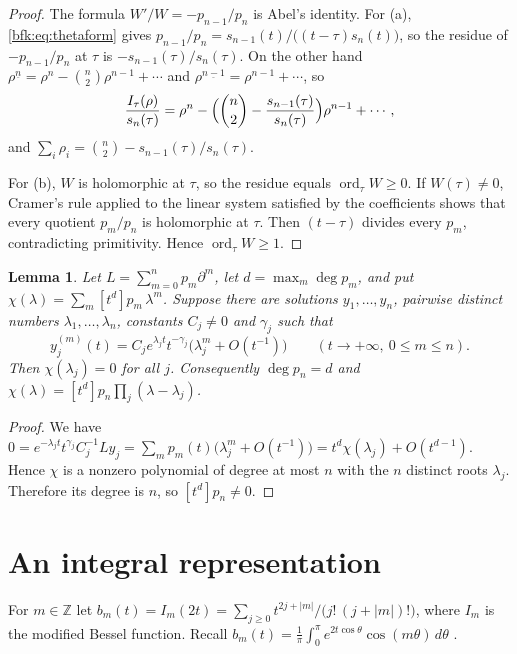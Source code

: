 \documentclass[11pt,a4paper]{article}
\newtheorem{lemma}[theorem]{Lemma}
\theoremstyle{definition}
\theoremstyle{remark}
\numberwithin{equation}{section}
\newcommand{\Z}{\mathbb{Z}}
\newcommand{\ff}[2]{#1^{\underline{#2}}}
\DeclareMathOperator{\ord}{ord}
\begin{document}
\begin{proof}
The formula $W'/W=-p_{n-1}/p_n$ is Abel's identity. For (a), \eqref{bfk:eq:thetaform} gives $p_{n-1}/p_n=s_{n-1}(t)/\bigl((t-\tau)s_n(t)\bigr)$, so the residue of $-p_{n-1}/p_n$ at $\tau$ is $-s_{n-1}(\tau)/s_n(\tau)$. On the other hand $\ff{\rho}{n}=\rho^n-\binom n2\rho^{n-1}+\cdots$ and $\ff{\rho}{n-1}=\rho^{n-1}+\cdots$, so
\[
\frac{I_\tau(\rho)}{s_n(\tau)}=\rho^n-\Bigl(\binom n2-\frac{s_{n-1}(\tau)}{s_n(\tau)}\Bigr)\rho^{n-1}+\cdots,
\]
and $\sum_i\rho_i=\binom n2-s_{n-1}(\tau)/s_n(\tau)$.

For (b), $W$ is holomorphic at $\tau$, so the residue equals $\ord_\tau W\ge0$. If $W(\tau)\ne0$, Cramer's rule applied to the linear system satisfied by the coefficients shows that every quotient $p_m/p_n$ is holomorphic at $\tau$. Then $(t-\tau)$ divides every $p_m$, contradicting primitivity. Hence ${\ord_\tau W\ge1}$.
\end{proof}

\begin{lemma}\label{bfk:lem:top}
Let $L=\sum_{m=0}^np_m\partial^m$, let $d=\max_m\deg p_m$, and put $\chi(\lambda)=\sum_{m}[t^d]p_m\,\lambda^m$. Suppose there are solutions $y_1,\dots,y_n$, pairwise distinct numbers $\lambda_1,\dots,\lambda_n$, constants $C_j\ne0$ and $\gamma_j$ such that
\[
y_j^{(m)}(t)=C_je^{\lambda_jt}t^{-\gamma_j}\bigl(\lambda_j^m+O(t^{-1})\bigr)\qquad(t\to+\infty,\ 0\le m\le n).
\]
Then $\chi(\lambda_j)=0$ for all $j$. Consequently $\deg p_n=d$ and $\chi(\lambda)=[t^d]p_n\prod_j(\lambda-\lambda_j)$.
\end{lemma}

\begin{proof}
We have $0=e^{-\lambda_jt}t^{\gamma_j}C_j^{-1}Ly_j=\sum_mp_m(t)\bigl(\lambda_j^m+O(t^{-1})\bigr)=t^d\chi(\lambda_j)+O(t^{d-1})$. Hence $\chi$ is a nonzero polynomial of degree at most $n$ with the $n$ distinct roots $\lambda_j$. Therefore its degree is $n$, so $[t^d]p_n\ne0$.
\end{proof}

\section{An integral representation}\label{bfk:sec:int}

For $m\in\Z$ let $b_m(t)=I_m(2t)=\sum_{j\ge0}t^{2j+|m|}/\bigl(j!\,(j+|m|)!\bigr)$, where $I_m$ is the modified Bessel function. Recall $b_m(t)=\frac1\pi\int_0^\pi e^{2t\cos\theta}\cos(m\theta)\,d\theta$ \cite[\S10.32]{DLMF}.
\end{document}
